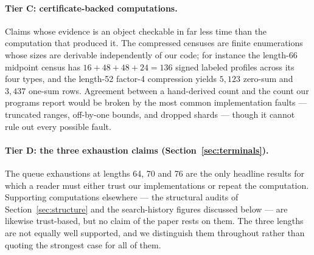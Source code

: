 \documentclass[11pt]{article}
\begin{document}
\paragraph{Tier C: certificate-backed computations.}
Claims whose evidence is an object checkable in far less time than the
computation that produced it.  The compressed censuses are finite enumerations
whose sizes are derivable independently of our code; for instance the
length-66 midpoint census has $16+48+48+24=136$ signed labeled profiles across
its four types, and the length-52 factor-4 compression yields $5{,}123$
zero-sum and $3{,}437$ one-sum rows.  Agreement between a hand-derived count
and the count our programs report would be broken by the most common
implementation faults --- truncated ranges, off-by-one bounds, and dropped
shards --- though it cannot rule out every possible fault.

\paragraph{Tier D: the three exhaustion claims (Section~\ref{sec:terminals}).}
The queue exhaustions at lengths 64, 70 and 76 are the only headline results
for which a reader must either trust our implementations or repeat the
computation.  Supporting computations elsewhere --- the structural audits of
Section~\ref{sec:structure} and the search-history figures discussed below ---
are likewise trust-based, but no claim of the paper rests on them.  The
three lengths are not equally well supported, and we distinguish them
throughout rather than quoting the strongest case for all of them.
\end{document}

